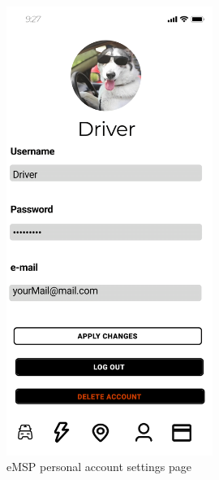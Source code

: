 \documentclass{Configuration_Files/PoliMi3i_thesis}
\begin{document}
\begin{figure}[H]
    \centering
    \includegraphics[width=0.6\textwidth]{Images/user-interface/emsp/eMSP (1)-11.png}
    \caption{eMSP personal account settings page}
\end{figure}
\end{document}
